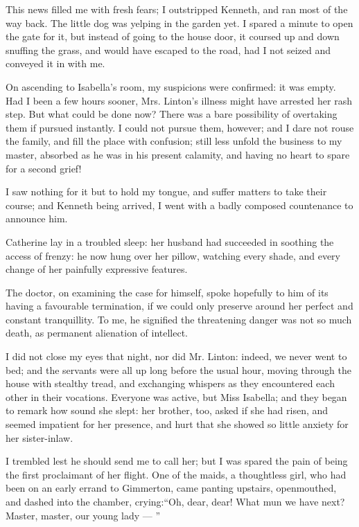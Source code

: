 \par This news filled me with fresh fears; I outstripped Kenneth, and ran most of the way back. The little dog was yelping in the garden yet. I spared a minute to open the gate for it, but instead of going to the house door, it coursed up and down snuffing the grass, and would have escaped to the road, had I not seized and conveyed it in with me.
\par On ascending to Isabella's room, my suspicions were confirmed: it was empty. Had I been a few hours sooner, Mrs. Linton's illness might have arrested her rash step. But what could be done now? There was a bare possibility of overtaking them if pursued instantly. I could not pursue them, however; and I dare not rouse the family, and fill the place with confusion; still less unfold the business to my master, absorbed as he was in his present calamity, and having no heart to spare for a second grief!
\par I saw nothing for it but to hold my tongue, and suffer matters to take their course; and Kenneth being arrived, I went with a badly composed countenance to announce him.
\par Catherine lay in a troubled sleep: her husband had succeeded in soothing the access of frenzy: he now hung over her pillow, watching every shade, and every change of her painfully expressive features.
\par The doctor, on examining the case for himself, spoke hopefully to him of its having a favourable termination, if we could only preserve around her perfect and constant tranquillity. To me, he signified the threatening danger was not so much death, as permanent alienation of intellect.
\par I did not close my eyes that night, nor did Mr. Linton: indeed, we never went to bed; and the servants were all up long before the usual hour, moving through the house with stealthy tread, and exchanging whispers as they encountered each other in their vocations. Everyone was active, but Miss Isabella; and they began to remark how sound she slept: her brother, too, asked if she had risen, and seemed impatient for her presence, and hurt that she showed so little anxiety for her sister-inlaw.
\par I trembled lest he should send me to call her; but I was spared the pain of being the first proclaimant of her flight. One of the maids, a thoughtless girl, who had been on an early errand to Gimmerton, came panting upstairs, openmouthed, and dashed into the chamber, crying:“Oh, dear, dear! What mun we have next? Master, master, our young lady — ”
